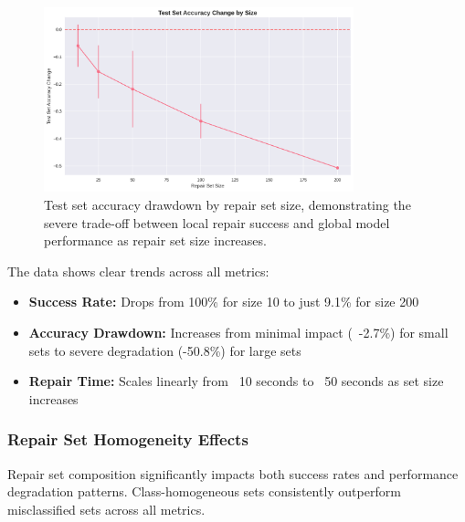 \documentclass{article}
\begin{document}
\begin{description}
\begin{figure}[h]
	\centering
	\includegraphics[width=0.8\textwidth]{results/one_shot_analysis/accuracy/accuracy_change_by_size.png}
	\caption{Test set accuracy drawdown by repair set size, demonstrating the severe trade-off between local repair success and global model performance as repair set size increases.}
	\label{fig:accuracy_drawdown_by_size}
\end{figure}

The data shows clear trends across all metrics:
\begin{itemize}
	\item \textbf{Success Rate:} Drops from 100\% for size 10 to just 9.1\% for size 200
	\item \textbf{Accuracy Drawdown:} Increases from minimal impact (~-2.7\%) for small sets to severe degradation (-50.8\%) for large sets
	\item \textbf{Repair Time:} Scales linearly from ~10 seconds to ~50 seconds as set size increases
\end{itemize}

\subsubsection{Repair Set Homogeneity Effects}

Repair set composition significantly impacts both success rates and performance degradation patterns. Class-homogeneous sets consistently outperform misclassified sets across all metrics.


\end{description}
\end{document}
